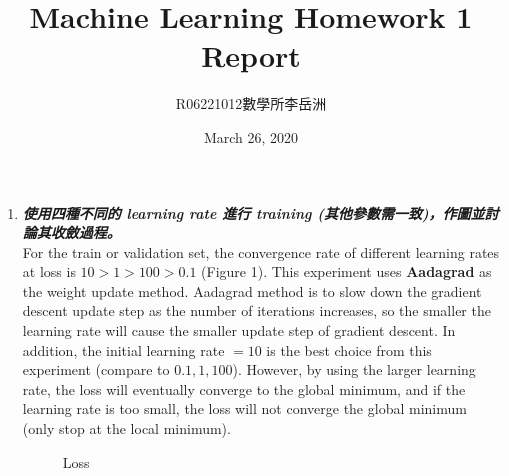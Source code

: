 \documentclass[a4paper,11pt]{article}
\title{Machine Learning Homework 1 Report}
\author{R06221012\hspace{0.2cm}數學所\hspace{0.2cm}李岳洲}
\date{March 26, 2020}
\begin{document}
\maketitle

\begin{enumerate}
	\item \textit{\textbf{使用四種不同的 learning rate 進行 training (其他參數需一致)，作圖並討論其收斂過程。}}\\

	For the train or validation set, the convergence rate of different learning rates at loss is $10 > 1 > 100 > 0.1$ (Figure 1). This experiment uses \textbf{Aadagrad} as the weight update method. Aadagrad method is to slow down the gradient descent update step as the number of iterations increases, so the smaller the learning rate will cause the smaller update step of gradient descent. In addition, the initial learning rate $= 10$ is the best choice from this experiment (compare to $0.1, 1, 100$). However, by using the larger learning rate, the loss will eventually converge to the global minimum, and if the learning rate is too small, the loss will not converge the global minimum (only stop at the local minimum).\\

	\begin{figure}[htp]
	    \begin{center}
	    	\quad
	    	\caption{Loss}
	    \end{center}
	\end{figure}



\end{enumerate}
\end{document}

